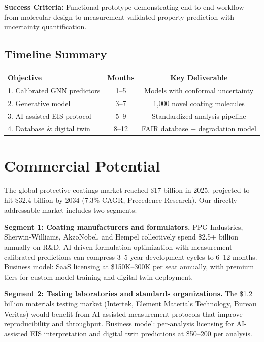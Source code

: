 \documentclass[11pt,letterpaper]{article}
\begin{document}
\textbf{Success Criteria:} Functional prototype demonstrating end-to-end workflow from molecular design to measurement-validated property prediction with uncertainty quantification.

\subsection{Timeline Summary}

\begin{center}
\begin{tabular}{lcc}
\toprule
\textbf{Objective} & \textbf{Months} & \textbf{Key Deliverable} \\
\midrule
1. Calibrated GNN predictors & 1--5 & Models with conformal uncertainty \\
2. Generative model & 3--7 & 1,000 novel coating molecules \\
3. AI-assisted EIS protocol & 5--9 & Standardized analysis pipeline \\
4. Database \& digital twin & 8--12 & FAIR database + degradation model \\
\bottomrule
\end{tabular}
\end{center}

\section{Commercial Potential}
\label{sec:commercial}

The global protective coatings market reached \$17 billion in 2025, projected to hit \$32.4 billion by 2034 (7.3\% CAGR, Precedence Research). Our directly addressable market includes two segments:

\textbf{Segment 1: Coating manufacturers and formulators.} PPG Industries, Sherwin-Williams, AkzoNobel, and Hempel collectively spend \$2.5+ billion annually on R\&D. AI-driven formulation optimization with measurement-calibrated predictions can compress 3--5 year development cycles to 6--12 months. Business model: SaaS licensing at \$150K--300K per seat annually, with premium tiers for custom model training and digital twin deployment.

\textbf{Segment 2: Testing laboratories and standards organizations.} The \$1.2 billion materials testing market (Intertek, Element Materials Technology, Bureau Veritas) would benefit from AI-assisted measurement protocols that improve reproducibility and throughput. Business model: per-analysis licensing for AI-assisted EIS interpretation and digital twin predictions at \$50--200 per analysis.
\end{document}
